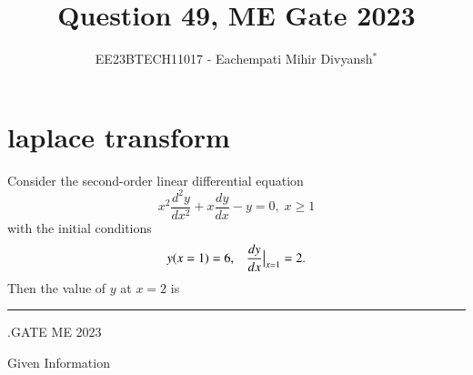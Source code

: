 \documentclass[journal,12pt,twocolumn]{IEEEtran}
\theoremstyle{remark}
\begin{document}

\vspace{3cm}

\title{Question 49, ME Gate 2023}
\author{EE23BTECH11017 - Eachempati Mihir Divyansh$^{*}$}
\chapter{laplace transform}
\maketitle
\newpage
\bigskip

\renewcommand{\thefigure}{\theenumi}
\renewcommand{\thetable}{\theenumi}

\question Consider the second-order linear differential equation
\[x^2\frac{d^2y}{dx^2}+x\frac{dy}{dx}-y=0, \; x\geq 1\]
with the initial conditions $$y(x=1)=6,\; \;\; \frac{dy}{dx}\big{|}_{x=1}=2.$$
Then the value of $y$ at $x=2$ is \rule{2cm}{0.1mm}.{\hfill{GATE ME 2023}}\\

\solution
\fi
\begin{table}[h!]
    \centering
    
    \caption{Given Information} \label{gateME49.tab:1}
\end{table}
\end{document}
